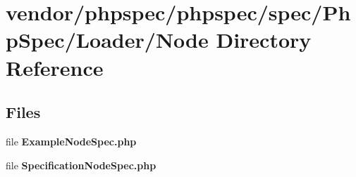 \section{vendor/phpspec/phpspec/spec/\+Php\+Spec/\+Loader/\+Node Directory Reference}
\label{dir_24354cc271adb146fbbac66609be11a2}
\subsection*{Files}
\begin{DoxyCompactItemize}
\item 
file {\bf Example\+Node\+Spec.\+php}
\item 
file {\bf Specification\+Node\+Spec.\+php}
\end{DoxyCompactItemize}
